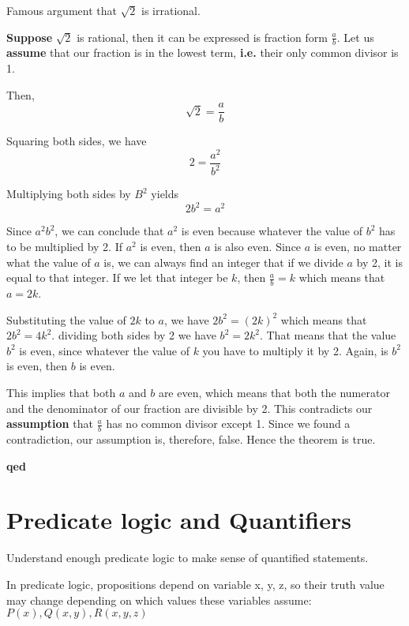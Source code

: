 \documentclass[10pt]{article}
\begin{document}
	\begin{description}
		\item[Example:] Famous argument that $\sqrt{2}$ is irrational.
		\item[Proof:]
		\item \textbf{Suppose} $\sqrt{2}$ is rational, then it can be expressed is fraction form $\frac{a}{b}$. Let us \textbf{assume} that our fraction is in the lowest term, \textbf{i.e.} their only common divisor is 1.
		\item Then, \[\sqrt{2}=\frac{a}{b}\]
		\item Squaring both sides, we have \[2=\frac{a^2}{b^2}\]
		\item Multiplying both sides by $B^2$ yields \[2b^2=a^2\]
		\item Since $a^2b^2$, we can conclude that $a^2$ is even because whatever the value of $b^2$ has to be multiplied by 2. If $a^2$ is even, then $a$ is also even. Since $a$ is even, no matter what the value of $a$ is, we can always find an integer that if we divide $a$ by 2, it is equal to that integer. If we let that integer be $k$, then $\frac{a}{b}=k$ which means that $a=2k$.
		\item Substituting the value of $2k$ to $a$, we have $2b^2=(2k)^2$ which means that $2b^2=4k^2$. dividing both sides by 2 we have $b^2=2k^2$. That means that the value $b^2$ is even, since whatever the value of $k$ you have to multiply it by 2. Again, is $b^2$ is even, then $b$ is even.
		\item This implies that both $a$ and $b$ are even, which means that both the numerator and the denominator of our fraction are divisible by 2. This contradicts our \textbf{assumption} that $\frac{a}{b}$ has no common divisor except 1. Since we found a contradiction, our assumption is, therefore, false. Hence the theorem is true.
		\item \textbf{qed}
	\end{description}
	
	\section{Predicate logic and Quantifiers}
	\begin{description}
		\item[Task:] Understand enough predicate logic to make sense of quantified statements.
		\item In predicate logic, propositions depend on variable x, y, z, so their truth value may change depending on which values these variables assume: $P(x), Q(x, y), R(x, y, z)$
	\end{description}
	
\end{document}
